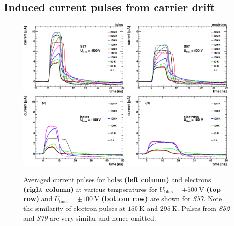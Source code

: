 \subsection{Induced current pulses from carrier drift}
\begin{figure}[tb]
 \centering
 \includegraphics[width=0.49\textwidth]{figures/TCTholes500_exS57.eps}
 \includegraphics[width=0.49\textwidth]{figures/TCTelecs500_exS57.eps}
 \includegraphics[width=0.49\textwidth]{figures/TCTholes100.eps}
 \includegraphics[width=0.49\textwidth]{figures/TCTelecs100.eps}

 \caption{Averaged current pulses for holes \textbf{(left column)} and electrons \textbf{(right column)} at various temperatures for
 $U_{\textrm{bias}} = \pm\SI{500}{\volt}$ \textbf{(top row)} and $U_{\textrm{bias}} = \pm\SI{100}{\volt}$ \textbf{(bottom row)} are shown for \textit{S57}.
 Note the similarity of electron pulses at $\SI{150}{\kelvin}$ and $\SI{295}{\kelvin}$. 
 Pulses from \textit{S52} and \textit{S79} are very similar and hence omitted.}
 \label{fig:currentprofiles}
\end{figure}

